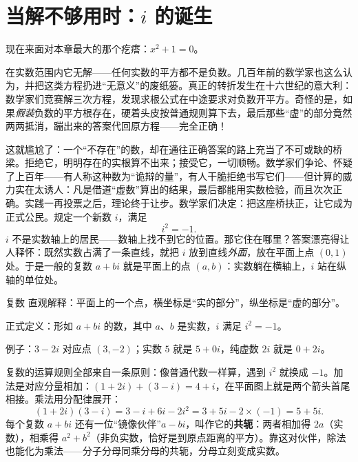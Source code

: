 \section{当解不够用时：$i$ 的诞生}

现在来面对本章最大的那个疙瘩：$x^2+1=0$。

在实数范围内它无解——任何实数的平方都不是负数。几百年前的数学家也这么认为，并把这类方程扔进“无意义”的废纸篓。真正的转折发生在十六世纪的意大利：数学家们竞赛解三次方程，发现求根公式在中途要求对负数开平方。奇怪的是，如果\emph{假装}负数的平方根存在，硬着头皮按普通规则算下去，最后那些“虚”的部分竟然两两抵消，蹦出来的答案代回原方程——完全正确！

这就尴尬了：一个“不存在”的数，却在通往正确答案的路上充当了不可或缺的桥梁。拒绝它，明明存在的实根算不出来；接受它，一切顺畅。数学家们争论、怀疑了上百年——有人称这种数为“诡辩的量”，有人干脆拒绝书写它们——但计算的威力实在太诱人：凡是借道“虚数”算出的结果，最后都能用实数检验，而且次次正确。实践一再投票之后，理论终于让步。数学家们决定：把这座桥扶正，让它成为正式公民。规定一个新数 $i$，满足
\[
i^2 = -1.
\]
$i$ 不是实数轴上的居民——数轴上找不到它的位置。那它住在哪里？答案漂亮得让人释怀：既然实数占满了一条直线，就把 $i$ 放到直线\emph{外面}，放在平面上点 $(0,1)$ 处。于是一般的复数 $a+bi$ 就是平面上的点 $(a,b)$：实数躺在横轴上，$i$ 站在纵轴的单位处。

\begin{shuyu}{复数}
直观解释：平面上的一个点，横坐标是“实的部分”，纵坐标是“虚的部分”。

正式定义：形如 $a+bi$ 的数，其中 $a$、$b$ 是实数，$i$ 满足 $i^2=-1$。

例子：$3-2i$ 对应点 $(3,-2)$；实数 $5$ 就是 $5+0i$，纯虚数 $2i$ 就是 $0+2i$。
\end{shuyu}

复数的运算规则全部来自一条原则：像普通代数一样算，遇到 $i^2$ 就换成 $-1$。加法是对应分量相加：$(1+2i)+(3-i)=4+i$，在平面图上就是两个箭头首尾相接。乘法用分配律展开：
\[
(1+2i)(3-i)=3-i+6i-2i^2=3+5i-2\times(-1)=5+5i.
\]
每个复数 $a+bi$ 还有一位“镜像伙伴”$a-bi$，叫作它的\textbf{共轭}：两者相加得 $2a$（实数），相乘得 $a^2+b^2$（非负实数，恰好是到原点距离的平方）。靠这对伙伴，除法也能化为乘法——分子分母同乘分母的共轭，分母立刻变成实数。

\begin{center}
\end{center}

